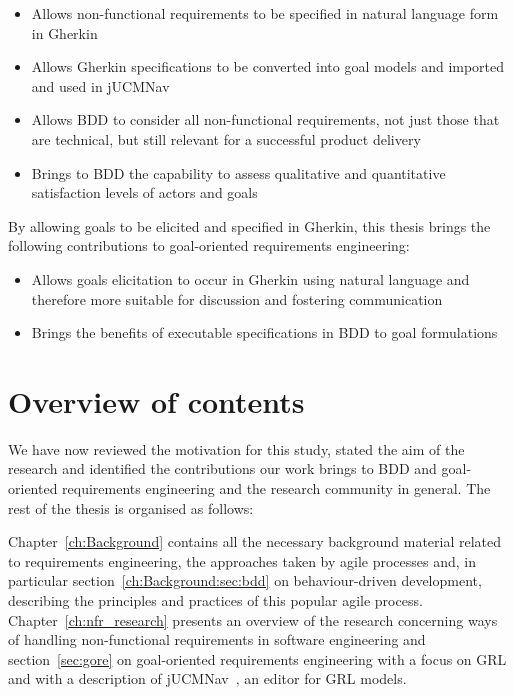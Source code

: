 \documentclass[dissertation,final]{softeng}
\begin{document}
\begin{center}
\begin{itemize}
\item Allows non-functional requirements to be specified in natural language form in Gherkin
\item Allows Gherkin specifications to be converted into goal models and imported and used in jUCMNav
\item Allows BDD to consider all non-functional requirements, not just those that are technical, but still relevant for a successful product delivery
\item Brings to BDD the capability to assess qualitative and quantitative satisfaction levels of actors and goals 
\end{itemize}
\end{center}

By allowing goals to be elicited and specified in Gherkin, this thesis brings the following contributions to goal-oriented requirements engineering:

\begin{center}
\begin{itemize}
\item Allows goals elicitation to occur in Gherkin using natural language and therefore more suitable for discussion and fostering communication
\item Brings the benefits of executable specifications in BDD to goal formulations
\end{itemize}
\end{center}


\section{Overview of contents}

We have now reviewed the motivation for this study, stated the aim of the research and identified the contributions our work brings to BDD and goal-oriented requirements engineering and the research community in general. The rest of the thesis is organised as follows:

Chapter~\ref{ch:Background} contains all the necessary background material related to requirements engineering, the approaches taken by agile processes and, in particular section~\ref{ch:Background:sec:bdd} on behaviour-driven development, describing the principles and practices of this popular agile process. Chapter~\ref{ch:nfr_research} presents an overview of the research concerning ways of handling non-functional requirements in software engineering and section~\ref{sec:gore} on goal-oriented requirements engineering with a focus on GRL and with a description of jUCMNav~\citep{Amyot2010}, an editor for GRL models.
\end{document}
